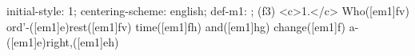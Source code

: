 initial-style: 1;
centering-scheme: english;
def-m1: \grealign;
(f3) <c>1.</c> Who([em1]fv) ord'-([em1]e)rest([em1]fv) time([em1]fh) and([em1]hg) change([em1]f) a-([em1]e)right,([em1]eh)